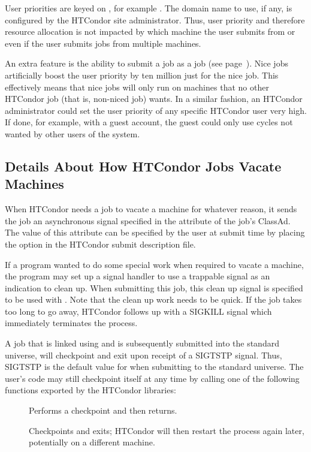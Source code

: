 User priorities are keyed on , for example
. The domain name to use, if any, is configured by
the HTCondor site administrator.  Thus, user priority and therefore resource
allocation is not impacted by which machine the user submits from or
even if the user submits jobs from multiple machines.

An extra feature is the ability to submit a job as
a  job (see page~\pageref{man-condor-submit-nice}).
Nice jobs artificially boost the user priority 
by ten million just for the nice job.
This effectively means that nice jobs will only run on
machines that no other HTCondor job (that is, non-niced job) wants.
In a similar fashion, an HTCondor administrator could set
the user priority of any specific HTCondor user very high.
If done, for example, with a guest account,
the guest could only use cycles not wanted by other users of the system.


\subsection{\label{sec:Vacate-Explained}
Details About How HTCondor Jobs Vacate Machines}

When HTCondor needs a job to vacate a machine for whatever reason, it
sends the job an asynchronous signal specified in the 
attribute of the job's ClassAd.
The value of this attribute can be specified by
the user at submit time by placing the  option in the
HTCondor submit description file.  

If a program wanted to do some special work when required
to vacate a machine, the program may set up a
signal handler to use a trappable signal as an indication
to clean up.
When submitting this job, this clean up signal is specified to be used with
.
Note that the clean up work needs to be quick.
If the job takes too long to go away, HTCondor
follows up with a SIGKILL signal which immediately terminates the
process.

A job that is linked using 
and is subsequently submitted into the standard universe, 
will checkpoint and exit upon receipt of a SIGTSTP signal.
Thus, SIGTSTP is
the default value for  when submitting to the standard
universe.
The user's code may still checkpoint itself at any time
by calling one of the following functions exported by the HTCondor libraries:
\begin{description}
\item[] Performs a checkpoint and then returns.
\item[] Checkpoints and exits; HTCondor will then
restart the process again later, potentially on a different machine.
\end{description}

